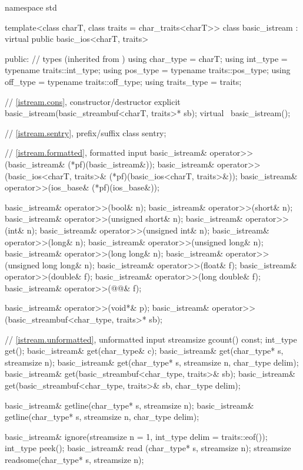 %
\begin{codeblock}
namespace std {
  template<class charT, class traits = char_traits<charT>>
  class basic_istream : virtual public basic_ios<charT, traits> {
  public:
    // types (inherited from )
    using char_type   = charT;
    using int_type    = typename traits::int_type;
    using pos_type    = typename traits::pos_type;
    using off_type    = typename traits::off_type;
    using traits_type = traits;

    // \ref{istream.cons}, constructor/destructor
    explicit basic_istream(basic_streambuf<charT, traits>* sb);
    virtual ~basic_istream();

    // \ref{istream.sentry}, prefix/suffix
    class sentry;

    // \ref{istream.formatted}, formatted input
    basic_istream& operator>>(basic_istream& (*pf)(basic_istream&));
    basic_istream& operator>>(basic_ios<charT, traits>& (*pf)(basic_ios<charT, traits>&));
    basic_istream& operator>>(ios_base& (*pf)(ios_base&));

    basic_istream& operator>>(bool& n);
    basic_istream& operator>>(short& n);
    basic_istream& operator>>(unsigned short& n);
    basic_istream& operator>>(int& n);
    basic_istream& operator>>(unsigned int& n);
    basic_istream& operator>>(long& n);
    basic_istream& operator>>(unsigned long& n);
    basic_istream& operator>>(long long& n);
    basic_istream& operator>>(unsigned long long& n);
    basic_istream& operator>>(float& f);
    basic_istream& operator>>(double& f);
    basic_istream& operator>>(long double& f);
    basic_istream& operator>>(@@& f);

    basic_istream& operator>>(void*& p);
    basic_istream& operator>>(basic_streambuf<char_type, traits>* sb);

    // \ref{istream.unformatted}, unformatted input
    streamsize gcount() const;
    int_type get();
    basic_istream& get(char_type& c);
    basic_istream& get(char_type* s, streamsize n);
    basic_istream& get(char_type* s, streamsize n, char_type delim);
    basic_istream& get(basic_streambuf<char_type, traits>& sb);
    basic_istream& get(basic_streambuf<char_type, traits>& sb, char_type delim);

    basic_istream& getline(char_type* s, streamsize n);
    basic_istream& getline(char_type* s, streamsize n, char_type delim);

    basic_istream& ignore(streamsize n = 1, int_type delim = traits::eof());
    int_type       peek();
    basic_istream& read    (char_type* s, streamsize n);
    streamsize     readsome(char_type* s, streamsize n);

}}
\end{codeblock}
